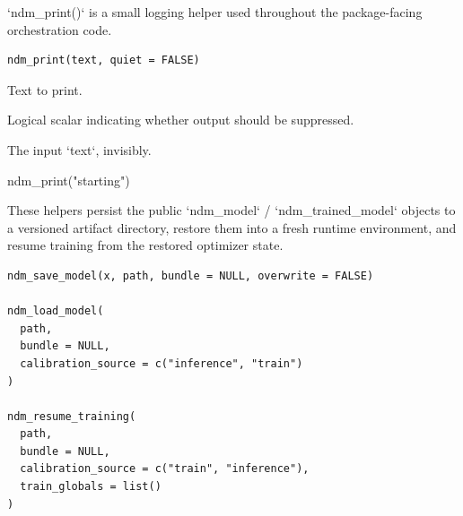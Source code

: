 \documentclass[a4paper]{book}
\begin{document}
%
\begin{Description}
`ndm\_print()` is a small logging helper used throughout the package-facing
orchestration code.
\end{Description}
%
\begin{Usage}
\begin{verbatim}
ndm_print(text, quiet = FALSE)
\end{verbatim}
\end{Usage}
%
\begin{Arguments}
\begin{ldescription}
\item[\code{text}] Text to print.

\item[\code{quiet}] Logical scalar indicating whether output should be suppressed.
\end{ldescription}
\end{Arguments}
%
\begin{Value}
The input `text`, invisibly.
\end{Value}
%
\begin{Examples}
\begin{ExampleCode}
ndm_print("starting")

\end{ExampleCode}
\end{Examples}
%
\begin{Description}
These helpers persist the public `ndm\_model` / `ndm\_trained\_model` objects to
a versioned artifact directory, restore them into a fresh runtime
environment, and resume training from the restored optimizer state.
\end{Description}
%
\begin{Usage}
\begin{verbatim}
ndm_save_model(x, path, bundle = NULL, overwrite = FALSE)

ndm_load_model(
  path,
  bundle = NULL,
  calibration_source = c("inference", "train")
)

ndm_resume_training(
  path,
  bundle = NULL,
  calibration_source = c("train", "inference"),
  train_globals = list()
)
\end{verbatim}
\end{Usage}
%
\end{document}
